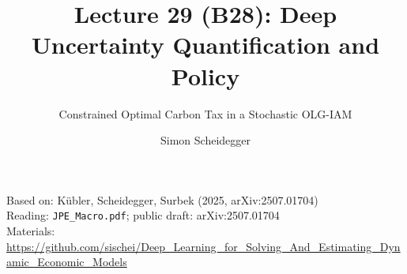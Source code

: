 \documentclass[aspectratio=169,11pt]{beamer}
\title[Lecture 29 (B28)]{Lecture 29 (B28): Deep Uncertainty Quantification and Policy}
\subtitle{Constrained Optimal Carbon Tax in a Stochastic OLG-IAM}
\author{Simon Scheidegger}
\institute{HEC, University of Lausanne}
\date{}
\begin{document}
\newcommand{\exercisepause}{%
  \tikz[baseline=(X.base)]{\node[fill=darkgreen!80!black, text=white,
  rounded corners=2pt, inner sep=3pt, font=\scriptsize\bfseries](X){PAUSE --- 5 min};}}



{
\begin{frame}
\titlepage
\vspace{-0.4cm}
\begin{center}
{\footnotesize Based on: K\"ubler, Scheidegger, Surbek (2025, arXiv:2507.01704)}\\[2pt]
{\footnotesize Reading: \texttt{JPE\_Macro.pdf}; public draft: arXiv:2507.01704}\\[4pt]
{\footnotesize Materials: \url{https://github.com/sischei/Deep_Learning_for_Solving_And_Estimating_Dynamic_Economic_Models}}
\end{center}
\end{frame}
}
\end{document}
